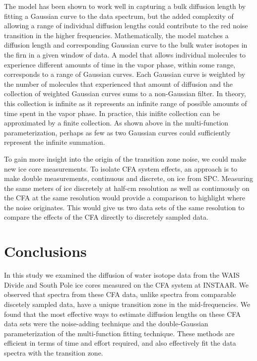 \documentclass[draft, jgrga]{AGUTeX}
\begin{document}
\begin{article}
The \citet{Johnsen2000} model has been shown to work well in capturing a bulk diffusion length by fitting a Gaussian curve to the data spectrum, but the added complexity of allowing a range of individual diffusion lengths could contribute to the red noise transition in the higher frequencies. Mathematically, the \citet{Johnsen2000} model matches a diffusion length and corresponding Gaussian curve to the bulk water isotopes in the firn in a given window of data. A model that allows individual molecules to experience different amounts of time in the vapor phase, within some range, corresponds to a range of Gaussian curves. Each Gaussian curve is weighted by the number of molecules that experienced that amount of diffusion and the collection of weighted Gaussian curves sums to a non-Gaussian filter. In theory, this collection is infinite as it represents an infinite range of possible amounts of time spent in the vapor phase. In practice, this inifite collection can be approximated by a finite collection. As shown above in the multi-function parameterization, perhaps as few as two Gaussian curves could sufficiently represent the infinite summation.

To gain more insight into the origin of the transition zone noise, we could make new ice core measurements. To isolate CFA system effects, an approach is to make double measurements, continuous and discrete, on ice from SPC. Measuring the same meters of ice discretely at half-cm resolution as well as continuously on the CFA at the same resolution would provide a comparison to highlight where the noise originates. This would give us two data sets of the same resolution to compare the effects of the CFA directly to discretely sampled data.


\section{Conclusions}

In this study we examined the diffusion of water isotope data from the WAIS Divide and South Pole ice cores measured on the CFA system at INSTAAR. We observed that spectra from these CFA data, unlike spectra from comparable discetely sampled data, have a unique transition zone in the mid-frequencies. We found that the most effective ways to estimate diffusion lengths on these CFA data sets were the noise-adding technique and the double-Gaussian parameterization of the multi-function fitting technique. These methods are efficient in terms of time and effort required, and also effectively fit the data spectra with the transition zone.


\end{article}
\end{document}
